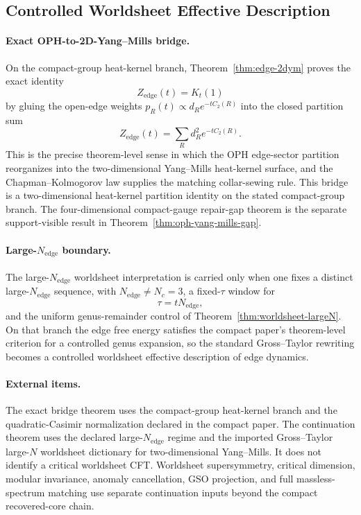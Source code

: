 \subsection{Controlled Worldsheet Effective Description}

\paragraph{Exact OPH-to-2D-Yang--Mills bridge.}
On the compact-group heat-kernel branch, Theorem~\ref{thm:edge-2dym} proves the exact identity
\[
Z_{\mathrm{edge}}(t)=K_t(1)
\]
by gluing the open-edge weights \(p_R(t)\propto d_R e^{-tC_2(R)}\) into the closed partition sum
\[
Z_{\mathrm{edge}}(t)=\sum_R d_R^2 e^{-tC_2(R)}.
\]
This is the precise theorem-level sense in which the OPH edge-sector partition reorganizes into
the two-dimensional Yang--Mills heat-kernel surface, and the Chapman--Kolmogorov law supplies the
matching collar-sewing rule.
This bridge is a two-dimensional heat-kernel partition identity on the stated compact-group
branch. The four-dimensional compact-gauge repair-gap theorem is the separate support-visible
result in Theorem~\ref{thm:oph-yang-mills-gap}.

\paragraph{Large-\(N_{\mathrm{edge}}\) boundary.}
The large-\(N_{\mathrm{edge}}\)
worldsheet interpretation is carried only when one fixes a distinct large-\(N_{\mathrm{edge}}\)
sequence, with \(N_{\mathrm{edge}}\neq N_c=3\), a fixed-\(\tau\) window for
\[
\tau=tN_{\mathrm{edge}},
\]
and the uniform genus-remainder control of Theorem~\ref{thm:worldsheet-largeN}. On that branch the
edge free energy satisfies the compact paper's theorem-level criterion for a controlled genus
expansion, so the standard Gross--Taylor rewriting becomes a controlled worldsheet effective
description of edge dynamics.

\paragraph{External items.}
The exact bridge theorem uses the compact-group heat-kernel branch and the quadratic-Casimir
normalization declared in the compact paper. The continuation theorem uses the declared
large-\(N_{\mathrm{edge}}\) regime and the imported Gross--Taylor large-\(N\) worldsheet dictionary
for two-dimensional Yang--Mills. It does not identify a critical worldsheet CFT. Worldsheet
supersymmetry, critical dimension, modular invariance, anomaly cancellation, GSO projection, and
full massless-spectrum matching use separate continuation inputs beyond the compact recovered-core
chain.

